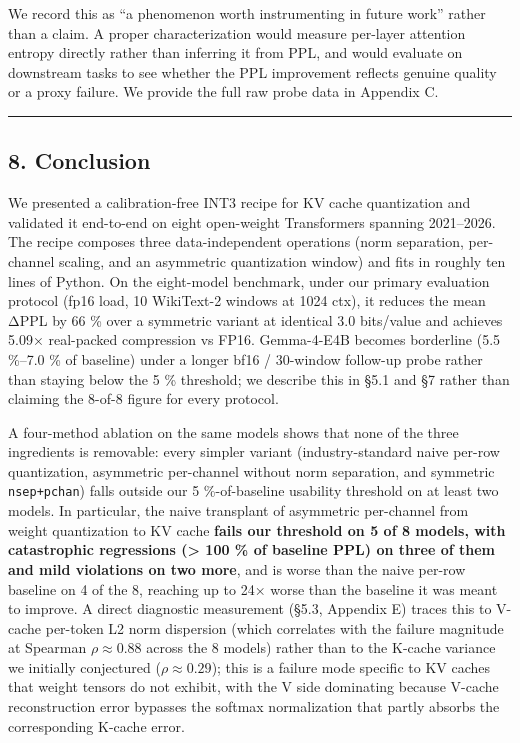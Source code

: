 We record this as ``a phenomenon worth instrumenting in future work''
rather than a claim. A proper characterization would measure per-layer
attention entropy directly rather than inferring it from PPL, and would
evaluate on downstream tasks to see whether the PPL improvement reflects
genuine quality or a proxy failure. We provide the full raw probe data
in Appendix C.

\begin{center}\rule{0.5\linewidth}{0.5pt}\end{center}

\subsection{8. Conclusion}\label{conclusion}

We presented a calibration-free INT3 recipe for KV cache quantization
and validated it end-to-end on eight open-weight Transformers spanning
2021--2026. The recipe composes three data-independent operations (norm
separation, per-channel scaling, and an asymmetric quantization window)
and fits in roughly ten lines of Python. On the eight-model benchmark,
under our primary evaluation protocol (fp16 load, 10 WikiText-2 windows
at 1024 ctx), it reduces the mean ΔPPL by 66 \% over a symmetric variant
at identical 3.0 bits/value and achieves 5.09× real-packed compression
vs FP16. Gemma-4-E4B becomes borderline (5.5 \%--7.0 \% of baseline)
under a longer bf16 / 30-window follow-up probe rather than staying
below the 5 \% threshold; we describe this in §5.1 and §7 rather than
claiming the 8-of-8 figure for every protocol.

A four-method ablation on the same models shows that none of the three
ingredients is removable: every simpler variant (industry-standard naive
per-row quantization, asymmetric per-channel without norm separation,
and symmetric \texttt{nsep+pchan}) falls outside our 5 \%-of-baseline
usability threshold on at least two models. In particular, the naive
transplant of asymmetric per-channel from weight quantization to KV
cache \textbf{fails our threshold on 5 of 8 models, with catastrophic
regressions (\textgreater{} 100 \% of baseline PPL) on three of them and
mild violations on two more}, and is worse than the naive per-row
baseline on 4 of the 8, reaching up to 24× worse than the baseline it
was meant to improve. A direct diagnostic measurement (§5.3, Appendix E)
traces this to V-cache per-token L2 norm dispersion (which correlates
with the failure magnitude at Spearman \(\rho \approx 0.88\) across the
8 models) rather than to the K-cache variance we initially conjectured
(\(\rho \approx 0.29\)); this is a failure mode specific to KV caches
that weight tensors do not exhibit, with the V side dominating because
V-cache reconstruction error bypasses the softmax normalization that
partly absorbs the corresponding K-cache error.

